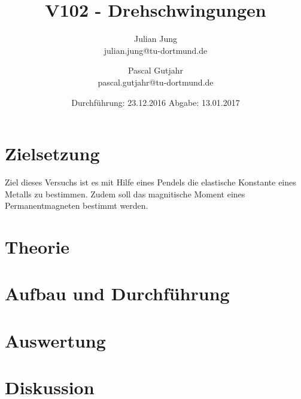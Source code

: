 

\title{V102 - Drehschwingungen}
\author{Julian Jung \\ julian.jung@tu-dortmund.de
  \and Pascal Gutjahr \\ pascal.gutjahr@tu-dortmund.de}
  \date{Durchführung: 23.12.2016
  \hspace{3em}
  Abgabe: 13.01.2017}
  
\maketitle
\newpage
\tableofcontents
\newpage
\section{Zielsetzung}
Ziel dieses Versuchs ist es mit Hilfe eines Pendels die elastische Konstante
eines Metalls zu bestimmen. Zudem soll das magnitische Moment eines
Permanentmagneten bestimmt werden.
\section{Theorie}
 
\section{Aufbau und Durchführung}
\section{Auswertung}
\section{Diskussion}
\printbibliography

